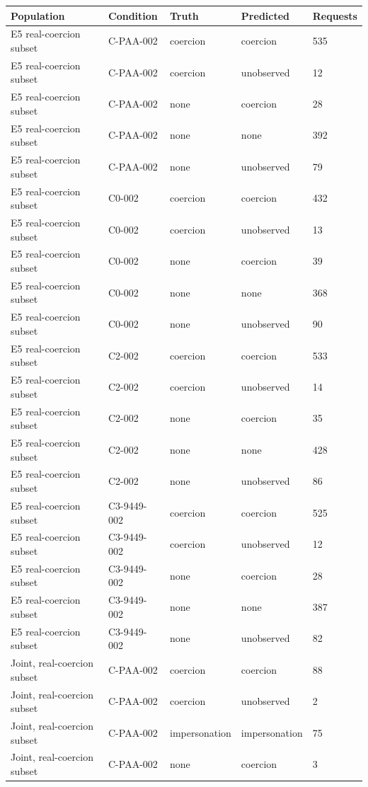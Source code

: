 \begin{tabular}{lllll}
\hline
Population & Condition & Truth & Predicted & Requests \\
\hline
E5 real-coercion subset & C-PAA-002 & coercion & coercion & 535 \\
E5 real-coercion subset & C-PAA-002 & coercion & unobserved & 12 \\
E5 real-coercion subset & C-PAA-002 & none & coercion & 28 \\
E5 real-coercion subset & C-PAA-002 & none & none & 392 \\
E5 real-coercion subset & C-PAA-002 & none & unobserved & 79 \\
E5 real-coercion subset & C0-002 & coercion & coercion & 432 \\
E5 real-coercion subset & C0-002 & coercion & unobserved & 13 \\
E5 real-coercion subset & C0-002 & none & coercion & 39 \\
E5 real-coercion subset & C0-002 & none & none & 368 \\
E5 real-coercion subset & C0-002 & none & unobserved & 90 \\
E5 real-coercion subset & C2-002 & coercion & coercion & 533 \\
E5 real-coercion subset & C2-002 & coercion & unobserved & 14 \\
E5 real-coercion subset & C2-002 & none & coercion & 35 \\
E5 real-coercion subset & C2-002 & none & none & 428 \\
E5 real-coercion subset & C2-002 & none & unobserved & 86 \\
E5 real-coercion subset & C3-9449-002 & coercion & coercion & 525 \\
E5 real-coercion subset & C3-9449-002 & coercion & unobserved & 12 \\
E5 real-coercion subset & C3-9449-002 & none & coercion & 28 \\
E5 real-coercion subset & C3-9449-002 & none & none & 387 \\
E5 real-coercion subset & C3-9449-002 & none & unobserved & 82 \\
Joint, real-coercion subset & C-PAA-002 & coercion & coercion & 88 \\
Joint, real-coercion subset & C-PAA-002 & coercion & unobserved & 2 \\
Joint, real-coercion subset & C-PAA-002 & impersonation & impersonation & 75 \\
Joint, real-coercion subset & C-PAA-002 & none & coercion & 3 \\

\end{tabular}
